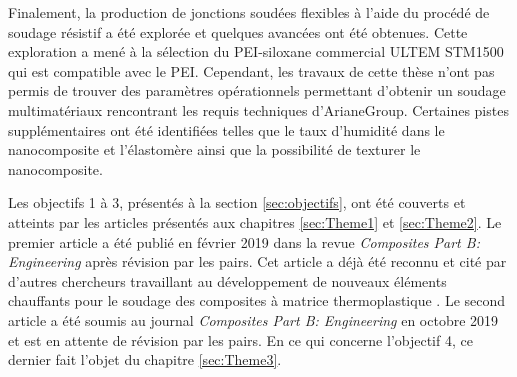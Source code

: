 Finalement, la production de jonctions soudées flexibles à l'aide du procédé de soudage résistif a été explorée et quelques avancées ont été obtenues. 
Cette exploration a mené à la sélection du PEI-siloxane commercial ULTEM STM1500 qui est compatible avec le PEI. 
Cependant, les travaux de cette thèse n'ont pas permis de trouver des paramètres opérationnels permettant d'obtenir un soudage multimatériaux rencontrant les requis techniques d'ArianeGroup. 
Certaines pistes supplémentaires ont été identifiées telles que le taux d'humidité dans le nanocomposite et l'élastomère ainsi que la possibilité de texturer le nanocomposite. 

Les objectifs 1 à 3, présentés à la section \ref{sec:objectifs}, ont été couverts et atteints par les articles présentés aux chapitres \ref{sec:Theme1} et \ref{sec:Theme2}. 
Le premier article \cite{Brassard2019a} a été publié en février 2019 dans la revue \textit{Composites Part B: Engineering} après révision par les pairs. 
Cet article a déjà été reconnu et cité par d'autres chercheurs travaillant au développement de nouveaux éléments chauffants pour le soudage des composites à matrice thermoplastique \cite{Russello2019,Su2020,Bhudolia2020,Bhudolia2020a}. 
Le second article a été soumis au journal \textit{Composites Part B: Engineering} en octobre 2019 et est en attente de révision par les pairs. 
En ce qui concerne l'objectif 4, ce dernier fait l'objet du chapitre \ref{sec:Theme3}. 